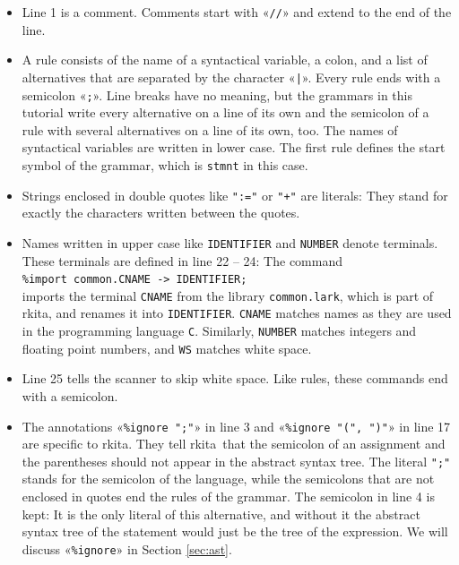 \documentclass[11pt,a4paper]{article}
\makeatletter
\newcommand{\blue}[1]{{\color{blue}#1}}
\newcommand{\fakesc}[1]{\resizebox{!}{0.99ex}{\textls[90]{\MakeUppercase{#1}}}}
\def\@simtextsc#1#2\@nil{\MakeUppercase{#1}\fakesc{#2}}
\newcommand{\simtextsc}[1]{%
  \ifmmode\text{\@simtextsc#1\@nil}\else\@simtextsc#1\@nil\fi}
\newcommand{\Larkita}{\simtextsc{Larkita}}
\makeatother
\begin{document}
\begin{itemize}
\item Line 1 is a comment.  Comments start with «\verb|//|» and extend to the end of the line.
\item A \blue{rule} consists of the name of a syntactical variable, a colon, and a list of
      \blue{alternatives} that are separated by the character «\verb+|+».  Every rule ends with a semicolon
      «\verb|;|».  Line breaks have no meaning, but the grammars in this tutorial write every alternative
      on a line of its own and the semicolon of a rule with several alternatives on a line of its own, too.
      The names of syntactical variables are written in lower case.  The first rule defines the
      \blue{start symbol} of the grammar, which is \texttt{stmnt} in this case.
\item Strings enclosed in double quotes like \verb|":="| or \verb|"+"| are \blue{literals}: They stand for
      exactly the characters written between the quotes.
\item Names written in upper case like \texttt{IDENTIFIER} and \texttt{NUMBER} denote \blue{terminals}.
      These terminals are defined in line 22 -- 24:  The command
      \\[0.2cm]
      \hspace*{1.3cm}
      \verb|%import common.CNAME -> IDENTIFIER;|
      \\[0.2cm]
      imports the terminal \texttt{CNAME} from the library \texttt{common.lark}, which is part of \Larkita,
      and renames it into \texttt{IDENTIFIER}.  \texttt{CNAME} matches names as they are used in the
      programming language \texttt{C}.  Similarly, \texttt{NUMBER} matches integers and floating point
      numbers, and \texttt{WS} matches white space.
\item Line 25 tells the scanner to skip white space.  Like rules, these commands end with a semicolon.
\item The annotations «\verb|%ignore ";"|» in line 3 and «\verb|%ignore "(", ")"|» in line 17 are specific to
      \Larkita.  They tell \Larkita\ that the semicolon of an assignment and the parentheses should not
      appear in the abstract syntax tree.  The literal \verb|";"| stands for the semicolon of the language,
      while the semicolons that are not enclosed in quotes end the rules of the grammar.
      The semicolon in line 4 is kept:  It is the only literal of this
      alternative, and without it the abstract syntax tree of the statement would just be the tree of the
      expression.  We will discuss «\verb|%ignore|» in Section \ref{sec:ast}.
\end{itemize}
\end{document}
